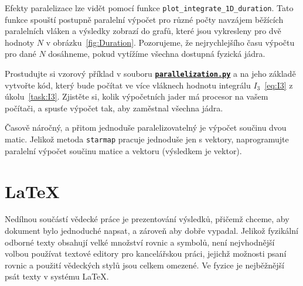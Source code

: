 \documentclass[a4paper,11pt,twoside]{article}
\def\code#1{\textnormal{\texttt{#1}}}
\def\ghfile#1#2{\textnormal{\textbf{\texttt{\href{https://github.com/PavelStransky/PCInPhysics/blob/main/#1#2}{#2}}}}}
\theoremstyle{red}
\theoremstyle{green}
\begin{document}
    Efekty paralelizace lze vidět pomocí funkce \code{plot_integrate_1D_duration}.
    Tato funkce spouští postupně paralelní výpočet pro různé počty navzájem běžících paralelních vláken a výsledky zobrazí do grafů, které jsou vykresleny pro dvě hodnoty $N$ v obrázku~\ref{fig:Duration}.  
    Pozorujeme, že nejrychlejšího času výpočtu pro dané $N$ dosáhneme, pokud vytížíme všechna dostupná fyzická jádra.

    \begin{task}
        Prostudujte si vzorový příklad v souboru \ghfile{python/montecarlo/}{parallelization.py} a na jeho základě vytvořte kód, který bude počítat ve více vláknech hodnotu integrálu $I_{3}$~\eqref{eq:I3} z úkolu~\ref{task:I3}.
        Zjistěte si, kolik výpočetních jader má procesor na vašem počítači, a spusťe výpočet tak, aby zaměstnal všechna jádra.
    \end{task}

    \begin{task}
        Časově náročný, a přitom jednoduše paralelizovatelný je výpočet součinu dvou matic.
        Jelikož metoda \code{starmap} pracuje jednoduše jen s vektory, naprogramujte paralelní výpočet součinu matice a vektoru (výsledkem je vektor).
    \end{task}

    \section{LaTeX}
    Nedílnou součástí vědecké práce je prezentování výsledků, přičemž chceme, aby dokument bylo jednoduché napsat, a zároveň aby dobře vypadal.
    Jelikož fyzikální odborné texty obsahují velké množství rovnic a symbolů, není nejvhodnější volbou používat textové editory pro kancelářskou práci, jejichž možnosti psaní rovnic a použití vědeckých stylů jsou celkem omezené.
    Ve fyzice je nejběžnější psát texty v systému \LaTeX. 
    
\end{document}
